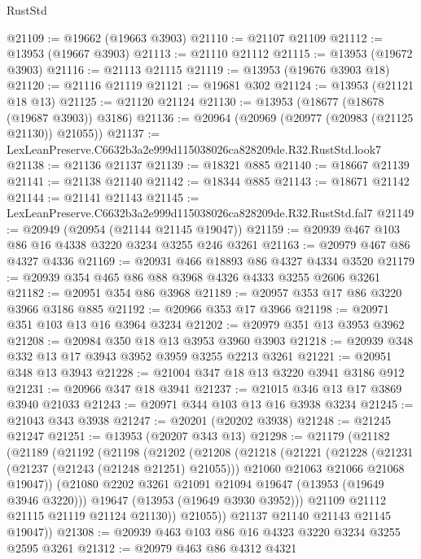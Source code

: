 \begin{lexlean}{RustStd}
\begin{coremodule}
@21109 := @19662 (@19663 @3903)
@21110 := @21107 @21109
@21112 := @13953 (@19667 @3903)
@21113 := @21110 @21112
@21115 := @13953 (@19672 @3903)
@21116 := @21113 @21115
@21119 := @13953 (@19676 @3903 @18)
@21120 := @21116 @21119
@21121 := @19681 @302
@21124 := @13953 (@21121 @18 @13)
@21125 := @21120 @21124
@21130 := @13953 (@18677 (@18678 (@19687 @3903)) @3186)
@21136 := @20964 (@20969 (@20977 (@20983 (@21125 @21130)) @21055))
@21137 := LexLeanPreserve.C6632b3a2e999d115038026ca828209de.R32.RustStd.look7
@21138 := @21136 @21137
@21139 := @18321 @885
@21140 := @18667 @21139
@21141 := @21138 @21140
@21142 := @18344 @885
@21143 := @18671 @21142
@21144 := @21141 @21143
@21145 := LexLeanPreserve.C6632b3a2e999d115038026ca828209de.R32.RustStd.fal7
@21149 := @20949 (@20954 (@21144 @21145 @19047))
@21159 := @20939 @467 @103 @86 @16 @4338 @3220 @3234 @3255 @246 @3261
@21163 := @20979 @467 @86 @4327 @4336
@21169 := @20931 @466 @18893 @86 @4327 @4334 @3520
@21179 := @20939 @354 @465 @86 @88 @3968 @4326 @4333 @3255 @2606 @3261
@21182 := @20951 @354 @86 @3968
@21189 := @20957 @353 @17 @86 @3220 @3966 @3186 @885
@21192 := @20966 @353 @17 @3966
@21198 := @20971 @351 @103 @13 @16 @3964 @3234
@21202 := @20979 @351 @13 @3953 @3962
@21208 := @20984 @350 @18 @13 @3953 @3960 @3903
@21218 := @20939 @348 @332 @13 @17 @3943 @3952 @3959 @3255 @2213 @3261
@21221 := @20951 @348 @13 @3943
@21228 := @21004 @347 @18 @13 @3220 @3941 @3186 @912
@21231 := @20966 @347 @18 @3941
@21237 := @21015 @346 @13 @17 @3869 @3940 @21033
@21243 := @20971 @344 @103 @13 @16 @3938 @3234
@21245 := @21043 @343 @3938
@21247 := @20201 (@20202 @3938)
@21248 := @21245 @21247
@21251 := @13953 (@20207 @343 @13)
@21298 := @21179
    (@21182
      (@21189
        (@21192
          (@21198
            (@21202
              (@21208
                (@21218
                  (@21221
                    (@21228
                      (@21231 (@21237 (@21243 (@21248 @21251) @21055)))
                      @21060
                      @21063
                      @21066
                      @21068
                      @19047))
                  (@21080 @2202 @3261 @21091 @21094 @19647 (@13953 (@19649 @3946 @3220)))
                  @19647
                  (@13953 (@19649 @3930 @3952)))
                @21109
                @21112
                @21115
                @21119
                @21124
                @21130))
            @21055))
        @21137
        @21140
        @21143
        @21145
        @19047))
@21308 := @20939 @463 @103 @86 @16 @4323 @3220 @3234 @3255 @2595 @3261
@21312 := @20979 @463 @86 @4312 @4321

\end{coremodule}
\end{lexlean}
